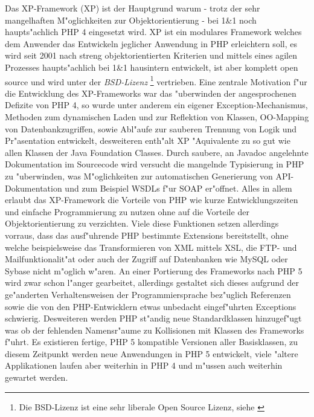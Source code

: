 Das XP-Framework \cite{XPHP} (XP) ist der Hauptgrund warum - trotz der sehr mangelhaften M"oglichkeiten zur 
Objektorientierung - bei 1\&1 noch haupts"achlich PHP 4 eingesetzt wird. XP ist ein modulares Framework welches
dem Anwender das Entwickeln jeglicher Anwendung in PHP erleichtern soll, es wird seit 2001 nach streng 
objektorientierten Kriterien und mittels eines agilen Prozesses haupts"achlich bei 1\&1 hausintern entwickelt,
ist aber komplett open source und wird unter der \emph{BSD-Lizenz}
\footnote{Die BSD-Lizenz ist eine sehr liberale Open Source Lizenz, siehe \cite{BSDLICENCE}}
vertrieben.
Eine zentrale Motivation f"ur die Entwicklung des XP-Frameworks war das "uberwinden der angesprochenen
Defizite von PHP 4, so wurde unter anderem ein eigener Exception-Mechanismus, Methoden zum dynamischen
Laden und zur Reflektion von Klassen, OO-Mapping von Datenbankzugriffen, sowie Abl"aufe zur sauberen 
Trennung von Logik und Pr"asentation entwickelt, desweiteren enth"alt XP "Aquivalente zu so gut wie allen Klassen 
der Java Foundation Classes.
Durch saubere, an Javadoc \cite{JAVADOC} angelehnte Dokumentation im Sourcecode wird versucht die mangelnde
Typisierung in PHP zu "uberwinden, was M"oglichkeiten zur automatischen Generierung von API-Dokumentation und zum
Beispiel WSDLs \cite{WSDLSPEC} f"ur SOAP er"offnet.
Alles in allem erlaubt das XP-Framework die Vorteile von PHP wie kurze Entwicklungszeiten und einfache 
Programmierung zu nutzen ohne auf die Vorteile der Objektorientierung zu verzichten.
Viele diese Funktionen setzen allerdings vorraus, dass das ausf"uhrende PHP bestimmte Extensions bereitstellt,
ohne welche beispielsweise das Transformieren von XML mittels XSL, die FTP- und Mailfunktionalit"at oder auch
der Zugriff auf Datenbanken wie MySQL oder Sybase nicht m"oglich w"aren.
An einer Portierung des Frameworks nach PHP 5 wird zwar schon l"anger gearbeitet, allerdings gestaltet sich dieses 
aufgrund der ge"anderten Verhaltensweisen der Programmiersprache bez"uglich Referenzen sowie die von den PHP-Entwicklern
etwas unbedacht eingef"uhrten Exceptions schwierig. Desweiteren werden PHP st"andig neue Standardklassen
hinzugef"ugt was ob der fehlenden Namensr"aume zu Kollisionen mit Klassen des Frameworks f"uhrt.
Es existieren fertige, PHP 5 kompatible Versionen aller Basisklassen, zu diesem Zeitpunkt werden neue Anwendungen 
in PHP 5 entwickelt, viele "altere Applikationen laufen aber weiterhin in PHP 4 und m"ussen auch weiterhin
gewartet werden.


